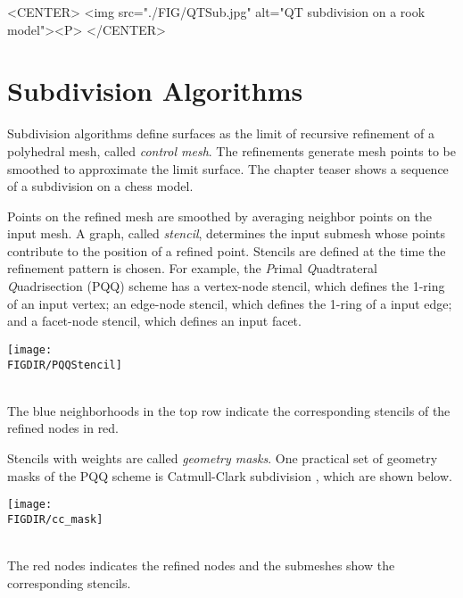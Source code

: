 \begin{ccHtmlOnly}
     <CENTER>
         <img src="./FIG/QTSub.jpg" alt="QT subdivision on a rook model"><P>
     </CENTER>
\end{ccHtmlOnly}

\section{Subdivision Algorithms}
Subdivision algorithms define surfaces as the limit
of recursive refinement of a polyhedral mesh, called
\emph{control mesh}. The refinements generate mesh points 
to be smoothed to approximate the limit surface.   
The chapter teaser shows a sequence of a subdivision on 
a chess model. 

Points on the refined mesh are smoothed by averaging
neighbor points on the input mesh. A graph, called \emph{stencil}, 
determines the input submesh whose points contribute to the 
position of a refined point. Stencils are defined at the time 
the refinement pattern is chosen.  
For example, the \emph{P}rimal \emph{Q}uadtrateral \emph{Q}uadrisection 
(PQQ) scheme has a vertex-node stencil, which defines 
the 1-ring of an input vertex; an edge-node stencil, which defines 
the 1-ring of a input edge; and a facet-node stencil, which defines 
an input facet.

\begin{ccTexOnly}
  \begin{center}
    \parbox{0.5\textwidth}{%
      \texttt{[image: \\FIGDIR/PQQStencil]}%
    }\\ \vspace{0.5cm}
    The blue neighborhoods in the top row indicate the corresponding
    stencils of the refined nodes in red. 
  \end{center}
\end{ccTexOnly}

Stencils with weights are called \emph{geometry masks}.
One practical set of geometry masks of the PQQ scheme is
Catmull-Clark subdivision \cite{cgal:cc-rgbss-78}, which are shown below.

\begin{ccTexOnly}
  \begin{center}
    \parbox{0.4\textwidth}{%
      \texttt{[image: \\FIGDIR/cc\_mask]}%
    } \\ \vspace{0.5cm}
    The red nodes indicates the refined nodes and the submeshes 
    show the corresponding stencils.
  \end{center}
\end{ccTexOnly}

